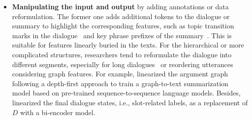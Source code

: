 \begin{itemize}
\item \textbf{Manipulating the input and output} by adding annotations or data reformulation. The former one adds additional tokens to the dialogue or summary to highlight the corresponding features, such as topic transition marks in the dialogue~\cite{chen2020multi} and key phrase prefixes of the summary~\cite{wu2021controllable}. This is suitable for features linearly buried in the texts. For the hierarchical or more complicated structures, researchers tend to reformulate the dialogue into different segments, especially for long dialogues~\cite{zhong2021qmsum,banerjee2015generating,shang2018unsupervised} or reordering utterances considering graph features. For example,  \citet{fabbri2021convosumm} linearized the argument graph following a depth-first approach to train a graph-to-text summarization model based on pre-trained sequence-to-sequence language models. Besides, \citet{zhao2021todsum} linearized the final dialogue states, i.e., slot-related labels, as a replacement of $D$ with a bi-encoder model.



\end{itemize}
